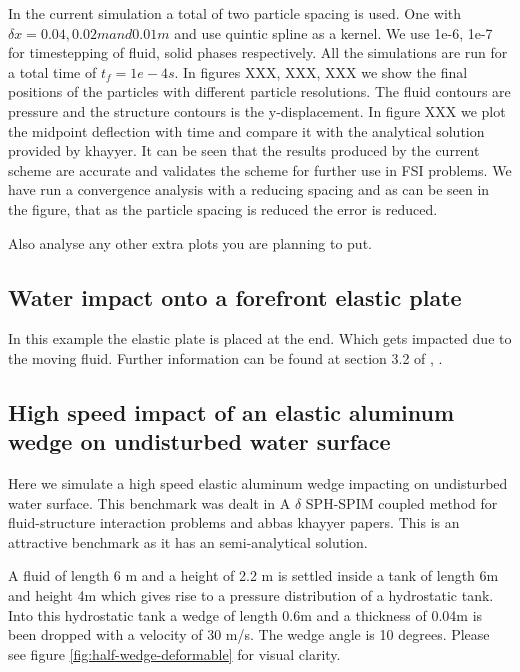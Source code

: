\documentclass[preprint,12pt]{elsarticle}
\begin{document}
In the current simulation a total of two particle spacing is used. One with
$\delta x = 0.04 , 0.02m and 0.01 m$ and use quintic spline as a kernel. We
use 1e-6, 1e-7 for timestepping of fluid, solid phases respectively. All the
simulations are run for a total time of $t_f = 1e-4s$. In figures XXX, XXX,
XXX we show the final positions of the particles with different particle
resolutions. The fluid contours are pressure and the structure contours is the
y-displacement. In figure XXX we plot the midpoint deflection with time and
compare it with the analytical solution provided by khayyer. It can be seen
that the results produced by the current scheme are accurate and validates the
scheme for further use in FSI problems. We have run a convergence analysis
with a reducing spacing and as can be seen in the figure, that as the particle
spacing is reduced the error is reduced.

Also analyse any other extra plots you are planning to put.



\subsection{Water impact onto a forefront elastic plate}
\label{sec:water-impact-forefront}

In this example the elastic plate is placed at the end. Which gets
impacted due to the moving fluid. Further information can be found at
section 3.2 of \cite{liu2013numerical}, \citet{sun2019fully}.




\subsection{High speed impact of an elastic aluminum wedge on undisturbed
  water surface}
\label{sec:wedge-impact-on-water}

Here we simulate a high speed elastic aluminum wedge impacting on undisturbed
water surface. This benchmark was dealt in
{A $\delta$ SPH-SPIM coupled method for fluid-structure interaction problems} and
{abbas khayyer} papers.
This is an attractive benchmark as it has an semi-analytical solution.

A fluid of length 6 m and a height of 2.2 m is settled inside a tank of length
6m and height 4m which gives rise to a pressure distribution of a hydrostatic
tank. Into this hydrostatic tank a wedge of length 0.6m and a thickness of
0.04m is been dropped with a velocity of 30 m/s. The wedge angle is 10
degrees. Please see figure \ref{fig:half-wedge-deformable} for visual clarity.
\end{document}
